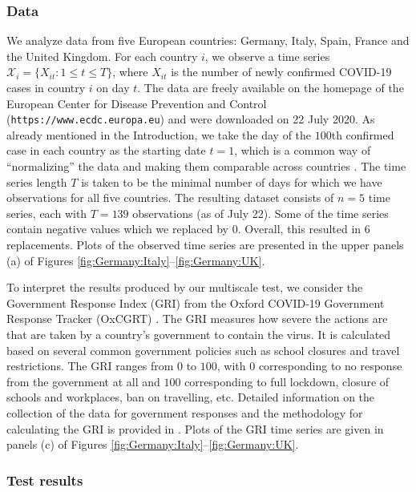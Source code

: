 \documentclass[a4paper,12pt]{article}
\numberwithin{equation}{section}
\begin{document}
\subsubsection{Data}


We analyze data from five European countries: Germany, Italy, Spain, France and the United Kingdom. For each country $i$, we observe a time series $\mathcal{X}_i = \{ X_{it}: 1 \le t \le T \}$, where $X_{it}$ is the number of newly confirmed COVID-19 cases in country $i$ on day $t$. The data are freely available on the homepage of the European Center for Disease Prevention and Control (\texttt{https://www.ecdc.europa.eu}) and were downloaded on 22 July 2020. As already mentioned in the Introduction, we take the day of the $100$th confirmed case in each country as the starting date $t=1$, which is a common way of ``normalizing'' the data and making them comparable across countries \citep[cp.][]{Cohen2020}. The time series length $T$ is taken to be the minimal number of days for which we have observations for all five countries. The resulting dataset consists of $n = 5$ time series, each with $T = 139$ observations (as of July 22). Some of the time series contain negative values which we replaced by $0$. Overall, this resulted in $6$ replacements. Plots of the observed time series are presented in the upper panels (a) of Figures \ref{fig:Germany:Italy}--\ref{fig:Germany:UK}.


To interpret the results produced by our multiscale test, we consider the Government Response Index (GRI) from the Oxford COVID-19 Government Response Tracker (OxCGRT) \citep{Hale2020}. The GRI measures how severe the actions are that are taken by a country's government to contain the virus. It is calculated based on several common government policies such as school closures and travel restrictions. The GRI ranges from $0$ to $100$, with $0$ corresponding to no response from the government at all and $100$ corresponding to full lockdown, closure of schools and workplaces, ban on travelling, etc. Detailed information on the collection of the data for government responses and the methodology for calculating the GRI is provided in \cite{Hale2020paper}. Plots of the GRI time series are given in panels (c) of Figures \ref{fig:Germany:Italy}--\ref{fig:Germany:UK}.


\subsubsection{Test results}
\end{document}
